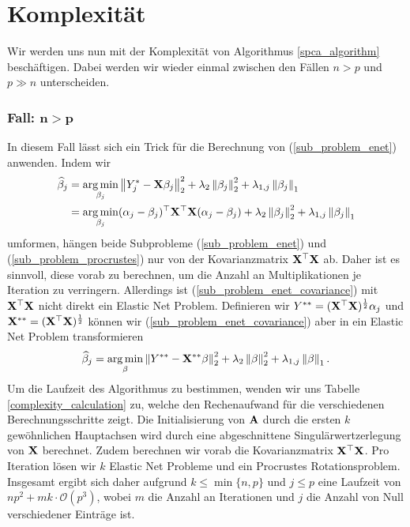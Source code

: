 

\section{Komplexität}
\label{complexity}

Wir werden uns nun mit der Komplexität von Algorithmus \ref{spca_algorithm} beschäftigen. Dabei werden wir wieder einmal zwischen den Fällen $n > p$ und $p \gg n$ unterscheiden.

\subsubsection{Fall: $\mathbf{n > p}$}

In diesem Fall lässt sich ein Trick für die Berechnung von (\ref{sub_problem_enet}) anwenden. Indem wir
\begin{align}
\label{sub_problem_enet_covariance}
\widehat{\beta}_j & = \operatorname*{arg\,min}_{\beta_j} \left\lVert Y_j^* - \mathbf{X} \beta_j \right\rVert_2^2 + \lambda_2 \left\lVert \beta_j \right\rVert_2^2 + \lambda_{1,j}\left\lVert \beta_j \right\rVert_1 \nonumber\\
& = \operatorname*{arg\,min}_{\beta_j} (\alpha_j - \beta_j)^{\top} \mathbf{X}^{\top} \mathbf{X} (\alpha_j - \beta_j) + \lambda_2 \left\lVert \beta_j \right\rVert_2^2 + \lambda_{1,j}\left\lVert \beta_j \right\rVert_1
\end{align}
umformen, hängen beide Subprobleme (\ref{sub_problem_enet}) und (\ref{sub_problem_procrustes}) nur von der Kovarianzmatrix $\mathbf{X}^{\top} \mathbf{X}$ ab. Daher ist es sinnvoll, diese vorab zu berechnen, um die Anzahl an Multiplikationen je Iteration zu verringern. Allerdings ist (\ref{sub_problem_enet_covariance}) mit $\mathbf{X}^{\top} \mathbf{X}$ nicht direkt ein Elastic Net Problem. Definieren wir $Y^{**} = (\mathbf{X}^{\top}\mathbf{X})^{\frac{1}{2}} \alpha_j$ und $\mathbf{X}^{**} = (\mathbf{X}^{\top}\mathbf{X})^{\frac{1}{2}}$ können wir (\ref{sub_problem_enet_covariance}) aber in ein Elastic Net Problem transformieren
$$\widehat{\beta}_j = \operatorname*{arg\,min}_{\beta} \left\lVert Y^{**} - \mathbf{X}^{**} \beta \right\rVert_2^2 + \lambda_2 \left\lVert \beta \right\rVert_2^2 + \lambda_{1,j}\left\lVert \beta \right\rVert_1.$$
Um die Laufzeit des Algorithmus zu bestimmen, wenden wir uns Tabelle \ref{complexity_calculation} zu, welche den Rechenaufwand für die verschiedenen Berechnungsschritte zeigt. Die Initialisierung von $\mathbf{A}$ durch die ersten $k$ gewöhnlichen Hauptachsen wird durch eine abgeschnittene Singulärwertzerlegung von $\mathbf{X}$ berechnet. Zudem berechnen wir vorab die Kovarianzmatrix $\mathbf{X}^{\top} \mathbf{X}$. Pro Iteration lösen wir $k$ Elastic Net Probleme und ein Procrustes Rotationsproblem. Insgesamt ergibt sich daher aufgrund $k \leq \min \{n,p\}$ und $j \leq p$ eine Laufzeit von $np^2 + mk\cdot\mathcal{O}(p^3)$, wobei $m$ die Anzahl an Iterationen und $j$ die Anzahl von Null verschiedener Einträge ist.

